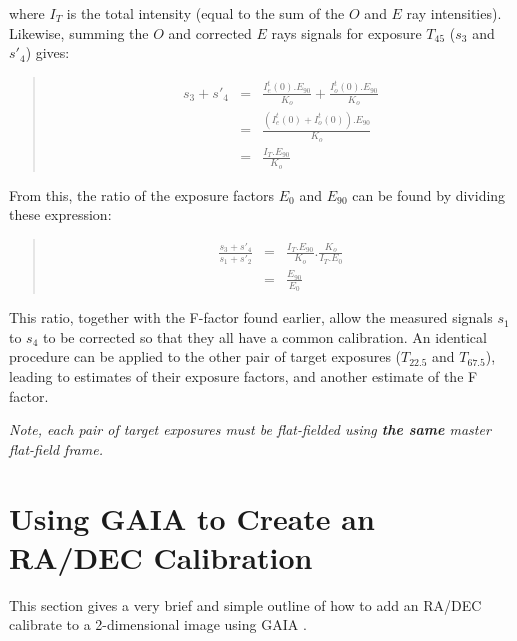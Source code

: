 \documentclass[twoside,11pt]{article}
\newcommand{\xref}[3]{#1}
\newcommand{\xlabel}[1]{}
\renewcommand{\_}{\texttt{\symbol{95}}}
\newenvironment{myquote}{\begin{quote}\begin{small}}{\end{small}\end{quote}}
\begin{document}
where $I_{T}$ is the total intensity (equal to the sum of the $O$ and $E$
ray intensities). Likewise, summing the $O$ and corrected $E$ rays signals 
for exposure $T_{45}$ ($s_{3}$ and $s'_{4}$) gives:

\begin{myquote}
\begin{eqnarray*}
   s_{3} + s'_{4} & = & \frac{ I^{t}_{e}(0).E_{90} }{ K_{o} } +
                        \frac{ I^{t}_{o}(0).E_{90} }{ K_{o} } \\
                  & = & \frac{ ( I^{t}_{e}(0) + I^{t}_{o}(0) ).E_{90} }{ K_{o} } \\ 
                  & = & \frac{ I_{T}.E_{90} }{ K_{o} } 
\end{eqnarray*}
\end{myquote}

From this, the ratio of the exposure factors $E_{0}$ and $E_{90}$ can be
found by dividing these expression:

\begin{myquote}
\begin{eqnarray*}
   \frac{ s_{3} + s'_{4} }{ s_{1} + s'_{2} }  & = & \frac{ I_{T}.E_{90} }{ K_{o} }.\frac{ K_{o} }{ I_{T}.E_{0} } \\
                                              & = & \frac{ E_{90} }{ E_{0} } 
\end{eqnarray*}
\end{myquote}

This ratio, together with the F-factor found earlier, allow the measured
signals $s_{1}$ to $s_{4}$ to be corrected so that they all have a common
calibration. An identical procedure can be applied to the other pair of
target exposures ($T_{22.5}$ and $T_{67.5}$), leading to estimates of
their exposure factors, and another estimate of the F factor.

\emph{Note, each pair of target exposures must be flat-fielded using
\textbf{the same} master flat-field frame.}

\section{\label{APP:GAIA}\xlabel{gaia}Using GAIA to Create an RA/DEC Calibration}
This section gives a very brief and simple outline of how to add an RA/DEC
calibrate to a 2-dimensional image using \xref{GAIA}{sun214}{} . 
\end{document}
